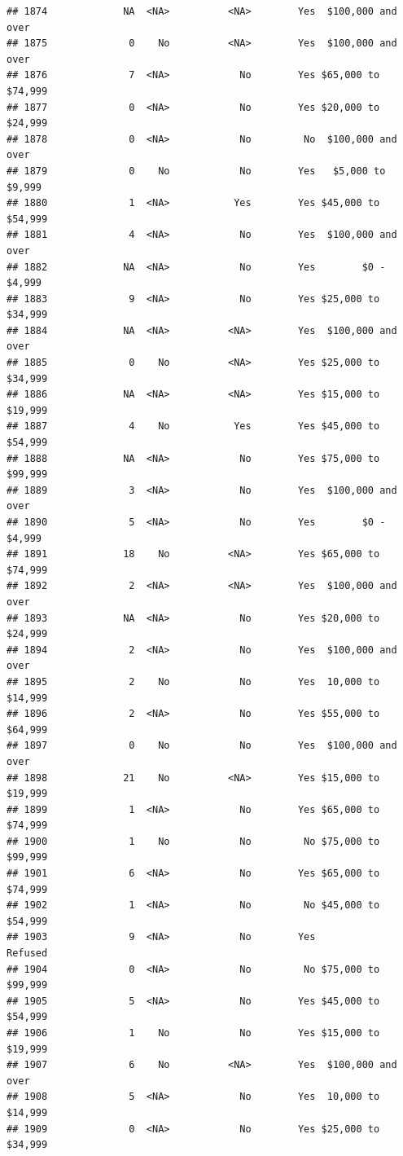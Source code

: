 \documentclass[man]{apa6}
\begin{document}
\begin{verbatim}
## 1874             NA  <NA>          <NA>        Yes  $100,000 and over
## 1875              0    No          <NA>        Yes  $100,000 and over
## 1876              7  <NA>            No        Yes $65,000 to $74,999
## 1877              0  <NA>            No        Yes $20,000 to $24,999
## 1878              0  <NA>            No         No  $100,000 and over
## 1879              0    No            No        Yes   $5,000 to $9,999
## 1880              1  <NA>           Yes        Yes $45,000 to $54,999
## 1881              4  <NA>            No        Yes  $100,000 and over
## 1882             NA  <NA>            No        Yes        $0 - $4,999
## 1883              9  <NA>            No        Yes $25,000 to $34,999
## 1884             NA  <NA>          <NA>        Yes  $100,000 and over
## 1885              0    No          <NA>        Yes $25,000 to $34,999
## 1886             NA  <NA>          <NA>        Yes $15,000 to $19,999
## 1887              4    No           Yes        Yes $45,000 to $54,999
## 1888             NA  <NA>            No        Yes $75,000 to $99,999
## 1889              3  <NA>            No        Yes  $100,000 and over
## 1890              5  <NA>            No        Yes        $0 - $4,999
## 1891             18    No          <NA>        Yes $65,000 to $74,999
## 1892              2  <NA>          <NA>        Yes  $100,000 and over
## 1893             NA  <NA>            No        Yes $20,000 to $24,999
## 1894              2  <NA>            No        Yes  $100,000 and over
## 1895              2    No            No        Yes  10,000 to $14,999
## 1896              2  <NA>            No        Yes $55,000 to $64,999
## 1897              0    No            No        Yes  $100,000 and over
## 1898             21    No          <NA>        Yes $15,000 to $19,999
## 1899              1  <NA>            No        Yes $65,000 to $74,999
## 1900              1    No            No         No $75,000 to $99,999
## 1901              6  <NA>            No        Yes $65,000 to $74,999
## 1902              1  <NA>            No         No $45,000 to $54,999
## 1903              9  <NA>            No        Yes            Refused
## 1904              0  <NA>            No         No $75,000 to $99,999
## 1905              5  <NA>            No        Yes $45,000 to $54,999
## 1906              1    No            No        Yes $15,000 to $19,999
## 1907              6    No          <NA>        Yes  $100,000 and over
## 1908              5  <NA>            No        Yes  10,000 to $14,999
## 1909              0  <NA>            No        Yes $25,000 to $34,999

\end{verbatim}
\end{document}
